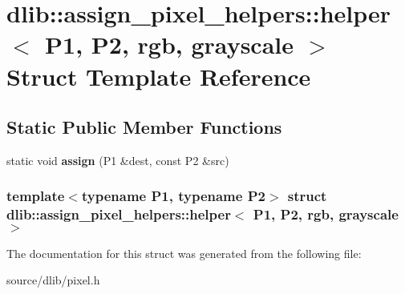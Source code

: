 \hypertarget{structdlib_1_1assign__pixel__helpers_1_1helper_3_01P1_00_01P2_00_01rgb_00_01grayscale_01_4}{
\section{dlib::assign\_\-pixel\_\-helpers::helper$<$ P1, P2, rgb, grayscale $>$ Struct Template Reference}
\label{structdlib_1_1assign__pixel__helpers_1_1helper_3_01P1_00_01P2_00_01rgb_00_01grayscale_01_4}
}
\subsection*{Static Public Member Functions}
\begin{DoxyCompactItemize}
\item 
\hypertarget{structdlib_1_1assign__pixel__helpers_1_1helper_3_01P1_00_01P2_00_01rgb_00_01grayscale_01_4_aba80472ad450ba4d94fe2b471b888bdd}{
static void {\bfseries assign} (P1 \&dest, const P2 \&src)}
\label{structdlib_1_1assign__pixel__helpers_1_1helper_3_01P1_00_01P2_00_01rgb_00_01grayscale_01_4_aba80472ad450ba4d94fe2b471b888bdd}

\end{DoxyCompactItemize}
\subsubsection*{template$<$typename P1, typename P2$>$ struct dlib::assign\_\-pixel\_\-helpers::helper$<$ P1, P2, rgb, grayscale $>$}



The documentation for this struct was generated from the following file:\begin{DoxyCompactItemize}
\item 
source/dlib/pixel.h\end{DoxyCompactItemize}

